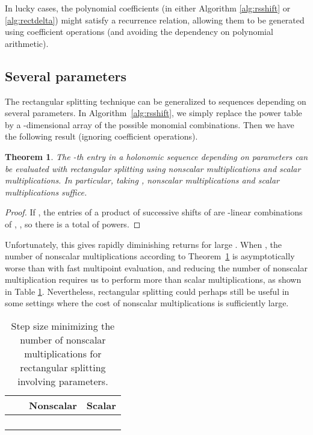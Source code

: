 \documentclass{sig-alternate}
\newtheorem{theorem}{Theorem}
\begin{document}
In lucky cases, the polynomial coefficients (in either
Algorithm \ref{alg:rsshift} or \ref{alg:rectdelta}) might
satisfy a recurrence relation, allowing them
to be generated using  coefficient operations
(and avoiding the dependency on polynomial arithmetic).



\subsection{Several parameters}

The rectangular splitting technique can be generalized
to sequences  depending on several parameters.
In Algorithm~\ref{alg:rsshift}, we simply replace the power
table by a -dimensional array of the possible
monomial combinations. Then we 
have the following result (ignoring coefficient operations).

\begin{theorem}
The -th entry in a holonomic sequence depending on  parameters
can be evaluated with rectangular splitting
using  nonscalar multiplications and
 scalar multiplications.
In particular, taking , 
nonscalar multiplications and  scalar multiplications
suffice.
\label{thm:several}
\end{theorem}

\begin{proof}
If , the entries of a
product of  successive shifts of  are -linear
combinations of ,
, so there is a total of  powers.
\end{proof}

Unfortunately, this gives rapidly diminishing returns for large .
When , the number of nonscalar multiplications
according to Theorem~\ref{thm:several} is
asymptotically worse than with fast multipoint evaluation,
and reducing the number of nonscalar multiplication
requires us to perform more than  scalar multiplications,
as shown in Table \ref{tab:dimension}.
Nevertheless, rectangular splitting could perhaps still be useful
in some settings where the cost of nonscalar
multiplications is sufficiently large.

\begin{table}[ht!]
\centering
\begin{tabular}{ l | l l l }
 &  & Nonscalar & Scalar\\ \hline
 &  &  &  \\
 &  &  &  \\
 &  &  &  \\
 &  &  &  \\
\end{tabular}
\caption{Step size  minimizing the number of
nonscalar multiplications for rectangular splitting involving  parameters.}
\label{tab:dimension}
\end{table}
\end{document}
